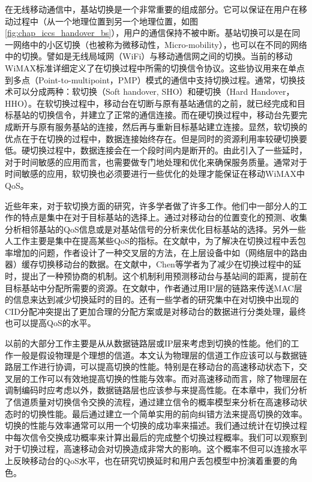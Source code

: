 在无线移动通信中，基站切换是一个非常重要的组成部分。它可以保证在用户在移动过程中（从一个地理位置到另一个地理位置，如图\ref{fig:chap_iccs_handover_bs}），用户的通信保持不被中断\cite{Pollini:1996:THD}\cite{Wright:ICMB2007}。基站切换可以是在同一网络中的小区切换（也被称为微移动性，Micro-mobility），也可以在不同的网络中的切换。譬如是无线局域网（WiFi）与移动通信网之间的切换。当前的移动WiMAX标准详细定义了在切换过程中所需的切换信令协议。这些协议用来在单点到多点（Point-to-multipoint，PMP）模式的通信中支持切换过程。通常，切换技术可以分成两种：软切换（Soft handover, SHO）和硬切换（Hard Handover，HHO）。在软切换过程中，移动台在切断与原有基站通信的之前，就已经完成和目标基站的切换信令，并建立了正常的通信连接。而在硬切换过程中，移动台先要完成断开与原有服务基站的连接，然后再与重新目标基站建立连接。显然，软切换的优点在于在切换的过程中，数据连接始终存在。但是同时的资源利用率较硬切换要低。硬切换过程中，数据连接会在一个段时间内是断开的。由此引入了一些延时，对于时间敏感的应用而言，也需要做专门地处理和优化来确保服务质量。通常对于时间敏感的应用，软切换也必须要进行一些优化的处理才能保证在移动WiMAX中QoS。

近些年来，对于软切换方面的研究，许多学者做了许多工作。他们中一部分人的工作的特点是集中在对于目标基站的选择上。通过对移动台的位置变化的预测、收集分析相邻基站的QoS信息或是对基站信号的分析来优化目标基站的选择\cite{Hsieh:INFOCOM2003}\cite{DooHwan:WPC2006}。另外一些人工作主要是集中在提高某些QoS的指标。在文献\cite{MinsikICACT2006}中，为了解决在切换过程中丢包率增加的问题，作者设计了一种交叉层的方法，在上层设备中如（网络层中的路由器）缓存切换移动台的数据。在文献\cite{JenHui:AUSWIRELESS:2007}中，Chen等学者为了减少在切换过程中的延时，提出了一种预协商的机制。这个机制利用预测移动台与基站间的距离，提前在目标基站中分配所需要的资源。在文献\cite{LingVTC2007}中，作者通过用IP层的链路来传送MAC层的信息来达到减少切换延时的目的。还有一些学者的研究集中在对切换中出现的CID分配冲突提出了更加合理的分配方案或是对移动台的数据进行分类处理，最终也可以提高QoS的水平\cite{Hu:TVT2004}\cite{Wenhua:ICC2007}。

以前的大部分工作主要是从从数据链路层或IP层来考虑到切换的性能。他们的工作一般是假设物理是个理想的信道。本文认为物理层的信道工作应该可以与数据链路层工作进行协调，可以提高切换的性能。特别是在移动台的高速移动状态下，交叉层的工作可以有效地提高切换的性能与效率。而对高速移动而言，除了物理层在调制编码时应考虑以外，数据链路层也应该参与来提高性能。在本章中，我们分析了信道质量对切换信令交换的流程，通过建立信令的概率模型来分析在高速移动状态时的切换性能。最后通过建立一个简单实用的前向纠错方法来提高切换的效率。切换的性能与效率通常可以用一个切换的成功率来描述。我们通过统计在切换过程中每次信令交换成功概率来计算出最后的完成整个切换过程概率。我们可以观察到对于切换过程，高速移动会对切换造成非常大的影响。这个概率不但可以连接水平上反映移动台的QoS水平，也在研究切换延时和用户丢包模型中扮演着重要的角色。

